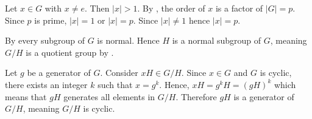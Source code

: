 \begin{questions}
    \item Let $x \in G$ with $x \neq e$. Then $|x| > 1$. By , the order of $x$ is a factor of $|G| = p$. Since $p$ is prime, $|x| = 1$ or $|x| = p$. Since $|x| \neq 1$ hence $|x| = p$.

    \item \begin{partquestions}{\roman*}
        \item By  every subgroup of $G$ is normal. Hence $H$ is a normal subgroup of $G$, meaning $G/H$ is a quotient group by .

        \item Let $g$ be a generator of $G$. Consider $xH \in G/H$. Since $x \in G$ and $G$ is cyclic, there exists an integer $k$ such that $x = g^k$. Hence, $xH = g^kH = (gH)^k$ which means that $gH$ generates all elements in $G/H$. Therefore $gH$ is a generator of $G/H$, meaning $G/H$ is cyclic.
    \end{partquestions}
\end{questions}


